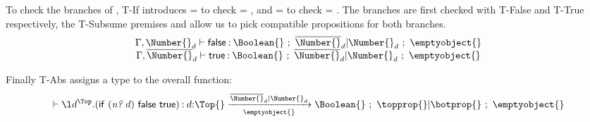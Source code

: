 To check the branches of {},
T-If
introduces  = 
to check  = {\false{}},
and  = 
to check 
 = \true{}.
%
The branches are first checked with T-False and T-True respectively,
the T-Subsume premises
\inpropenv {\propenv{}, {\thenprop {\prop{}}}} {\thenprop {\propp{}}}
and
\inpropenv {\propenv{}, {\elseprop {\prop{}}}} {\elseprop {\propp{}}}
allow us to pick compatible propositions for both branches.
$$
\begin{array}{c}
\judgementselfrewrite{\propenv{},{\isprop{\Number{}}{\makelocal{d}}}}
  {\false{}}
  {\Boolean{}}
  {\filterset{\notprop{\Number{}}{\makelocal{d}}}
             {\isprop{\Number{}}{\makelocal{d}}}}
  {\emptyobject{}}
  \\
\judgementselfrewrite{\propenv{},{\notprop{\Number{}}{\makelocal{d}}}}
  {\true{}}
  {\Boolean{}}
  {\filterset{\notprop{\Number{}}{\makelocal{d}}}
             {\isprop{\Number{}}{\makelocal{d}}}}
  {\emptyobject{}}
\end{array}
$$
%

Finally T-Abs assigns a type to the overall function:
$$
{\judgementselfrewrite{}{\abs{\makelocal{d}}{\Top}{\ifexp{\appexp{\numberhuh{}}{\makelocal{d}}}{\false{}}{\true{}}}}
                    {\ArrowOne {\makelocal{d}} {\Top{}}
                                      {\Boolean{}}
                                      {\filterset {\notprop{\Number{}}{\makelocal{d}}}
                                                  {\isprop{\Number{}}{\makelocal{d}}}}
                                      {\emptyobject{}}}
                    {\filterset {\topprop{}}
                                {\botprop{}}}
                    {\emptyobject{}}}
$$




